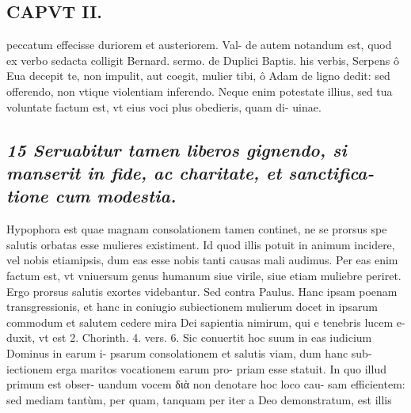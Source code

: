 \documentclass{article}
\begin{document}
\begin{pages}
\section*{CAPVT II. }
\marginpar{[ p.89 ]}\pstart peccatum effecisse duriorem et austeriorem. Val- de autem notandum est, quod ex verbo sedacta colligit Bernard. sermo. de Duplici Baptis. his verbis, Serpens ô Eua decepit te, non impulit, aut coegit, mulier tibi, ô Adam de ligno dedit: sed offerendo, non vtique violentiam inferendo. Neque enim potestate illius, sed tua voluntate factum est, vt eius voci plus obedieris, quam di- uinae.  \pend
{}
{}
\subsection*{\textit{15 Seruabitur tamen liberos gignendo, si manserit in fide, ac charitate, et sanctifica- tione cum modestia. }}\pstart Hypophora est quae magnam consolationem tamen continet, ne se prorsus spe salutis orbatas esse mulieres existiment. Id quod illis potuit in animum incidere, vel nobis etiamipsis, dum eas esse nobis tanti causas mali audimus. Per eas enim factum est, vt vniuersum genus humanum siue virile, siue etiam muliebre periret. Ergo prorsus salutis exortes videbantur. Sed contra Paulus. Hanc ipsam poenam transgressionis, et hanc in coniugio subiectionem mulierum docet in ipsarum commodum et salutem cedere mira Dei sapientia nimirum, qui e tenebris lucem e- duxit, vt est 2. Chorinth. 4. vers. 6. Sic conuertit hoc suum in eas iudicium Dominus in earum i- psarum consolationem et salutis viam, dum hanc sub- iectionem erga maritos vocationem earum pro- priam esse statuit. In quo illud primum est obser- uandum vocem διὰ non denotare hoc loco cau- sam efficientem: sed mediam tantùm, per quam, tanquam per iter a Deo demonstratum, est illis  \pend

\end{pages}
\end{document}
